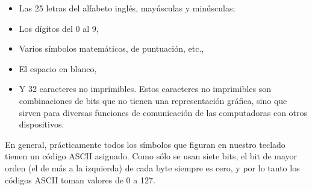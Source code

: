 \documentclass[a4paper]{article}
\newcommand\liststyleLi{%
\renewcommand\labelitemi{{\textbullet}}
\renewcommand\labelitemii{${\circ}$}
\renewcommand\labelitemiii{${\blacksquare}$}
\renewcommand\labelitemiv{{\textbullet}}
}
\begin{document}
\liststyleLi
\begin{itemize}
\item Las 25 letras del alfabeto inglés, mayúsculas y minúsculas; 
\item Los dígitos del 0 al 9, 
\item Varios símbolos matemáticos, de puntuación, etc., 
\item El espacio en blanco, 
\item Y 32 caracteres no imprimibles. Estos caracteres no imprimibles
son combinaciones de bits que no tienen una representación gráfica,
sino que sirven para diversas funciones de comunicación de las
computadoras con otros dispositivos. 
\end{itemize}
En general, prácticamente todos los símbolos que figuran en nuestro
teclado tienen un código ASCII asignado. Como sólo se usan siete
bits, el bit de mayor orden (el de más a la izquierda) de cada byte
siempre es cero, y por lo tanto los códigos ASCII toman valores de 0
a 127.


\end{document}
